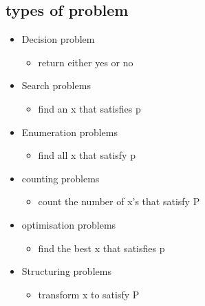 \documentclass{article}
\begin{document}
    \subsection{types of problem}
    \begin{itemize}
        \item{Decision problem}
            \begin{itemize}
                \item{return either yes or no}
            \end{itemize}
        \item{Search problems}
            \begin{itemize}
                \item{find an x that satisfies p}
            \end{itemize}
        \item{Enumeration problems}
            \begin{itemize}
                \item{find all x that satisfy p}
            \end{itemize}
        \item{counting problems}
            \begin{itemize}
                \item{count the number of x's that satisfy P}
            \end{itemize}
        \item{optimisation problems}
            \begin{itemize}
                \item{find the best x that satisfies p}
            \end{itemize}
        \item{Structuring problems}
            \begin{itemize}
                \item{transform x to satisfy P}
            \end{itemize}
    \end{itemize}
    
\end{document}
